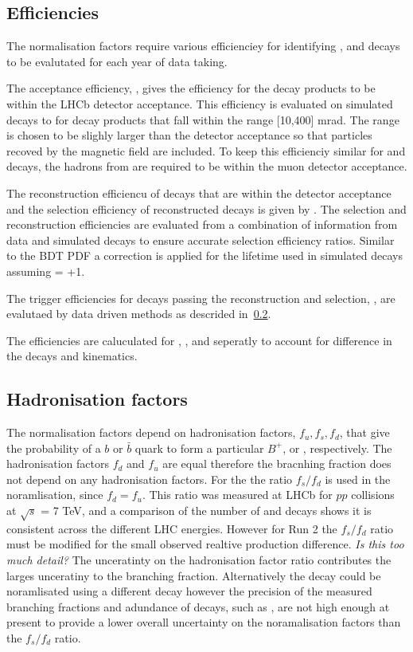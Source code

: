 \subsection{Efficiencies}
The normalisation factors require various efficienciey for identifying \bmumu, \bdkpi and \bujpsik decays to be evalutated for each year of data taking. %

The acceptance efficiency, , gives the efficiency for the decay products to be within the LHCb detector acceptance. This efficiency is evaluated on simulated decays to for decay products that fall within the range [10,400] mrad. The range is chosen to be slighly larger than the detector acceptance so that particles recoved by the magnetic field are included. To keep this efficienciy similar for \bmumu and \bdkpi decays, the hadrons from \bdkpi are required to be within the muon detector acceptance. 

The reconstruction efficiencu of decays that are within the detector acceptance and the selection efficiency of reconstructed decays is given by . The selection and reconstruction efficiencies are evaluated from a combination of information from data and simulated decays to ensure accurate selection efficiency ratios. Similar to the BDT PDF a correction is applied for the lifetime used in simulated \bsmumu decays assuming \ADG = +1. 

The trigger efficiencies for decays passing the reconstruction and selection, , are evalutaed by data driven methods as descrided in~\ref{}. 

The efficiencies are caluculated for \bsmumu, \bdmumu, \bdkpi and \bujpsik seperatly to account for difference in the decays and kinematics.

\subsection{Hadronisation factors}

The normalisation factors depend on hadronisation factors, $f_{u}, f_{s}, f_{d}$, that give the probability of a $b$ or $\bar{b}$ quark to form a particular $B^{+}$, \bs or \bd, respectively. The hadronisation factors $f_{d}$ and $f_{u}$ are equal therefore the \bmumu bracnhing fraction does not depend on any hadronisation factors. For the \bsmumu the ratio $f_{s}/f_{d}$ is used in the noramlisation, since $f_{d} = f_{u}$. This ratio was measured at LHCb for $pp$ collisions at $\sqrt{s}$ = 7 TeV, and a comparison of the number of \bujpsik and \bsjpisphi decays shows it is consistent across the different LHC energies. However for Run 2 the $f_{s}/f_{d}$ ratio must be modified for the small observed realtive production difference. {\it Is this too much detail?}
The unceratinty on the hadronisation factor ratio contributes the larges unceratiny to the \bsmumu branching fraction. Alternatively the \bsmumu decay could be noramlisated using a different \bs decay however the precision of the measured branching fractions and adundance of \bs decays, such as \bsjpsiphi, are not high enough at present to provide a lower overall uncertainty on the noramalisation factors than the $f_{s}/f_{d}$ ratio.


